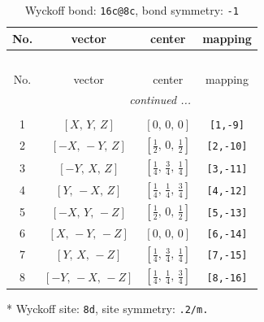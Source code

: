 \documentclass[fleqn,8pt]{jsarticle}
\begin{document}
\renewcommand{\arraystretch}{1.2}
\begin{longtable}{cccc}
\caption{Wyckoff bond: {\tt 16c@8c}, bond symmetry: {\tt -1}}
 \\
 \hline \hline
No. & vector & center & mapping \\ \hline \endfirsthead

\multicolumn{3}{l}{\tablename\ \thetable{}} \\
 \hline \hline
No. & vector & center & mapping \\ \hline \endhead

 \hline \hline
\multicolumn{3}{r}{\footnotesize\it continued ...} \\ \endfoot

 \hline \hline
\multicolumn{3}{r}{} \\ \endlastfoot

1 & $\left[ X,\, Y,\, Z \right]$ & $\left[ 0,\, 0,\, 0 \right]$ & {\tt [1,-9]} \\ \hline
2 & $\left[ - X,\, - Y,\, Z \right]$ & $\left[ \frac{1}{2},\, 0,\, \frac{1}{2} \right]$ & {\tt [2,-10]} \\ \hline
3 & $\left[ - Y,\, X,\, Z \right]$ & $\left[ \frac{1}{4},\, \frac{3}{4},\, \frac{1}{4} \right]$ & {\tt [3,-11]} \\ \hline
4 & $\left[ Y,\, - X,\, Z \right]$ & $\left[ \frac{1}{4},\, \frac{1}{4},\, \frac{3}{4} \right]$ & {\tt [4,-12]} \\ \hline
5 & $\left[ - X,\, Y,\, - Z \right]$ & $\left[ \frac{1}{2},\, 0,\, \frac{1}{2} \right]$ & {\tt [5,-13]} \\ \hline
6 & $\left[ X,\, - Y,\, - Z \right]$ & $\left[ 0,\, 0,\, 0 \right]$ & {\tt [6,-14]} \\ \hline
7 & $\left[ Y,\, X,\, - Z \right]$ & $\left[ \frac{1}{4},\, \frac{3}{4},\, \frac{1}{4} \right]$ & {\tt [7,-15]} \\ \hline
8 & $\left[ - Y,\, - X,\, - Z \right]$ & $\left[ \frac{1}{4},\, \frac{1}{4},\, \frac{3}{4} \right]$ & {\tt [8,-16]} \\
\end{longtable}
* Wyckoff site: {\tt 8d}, site symmetry: {\tt .2/m.}
\renewcommand{\arraystretch}{1.2}
\end{document}
